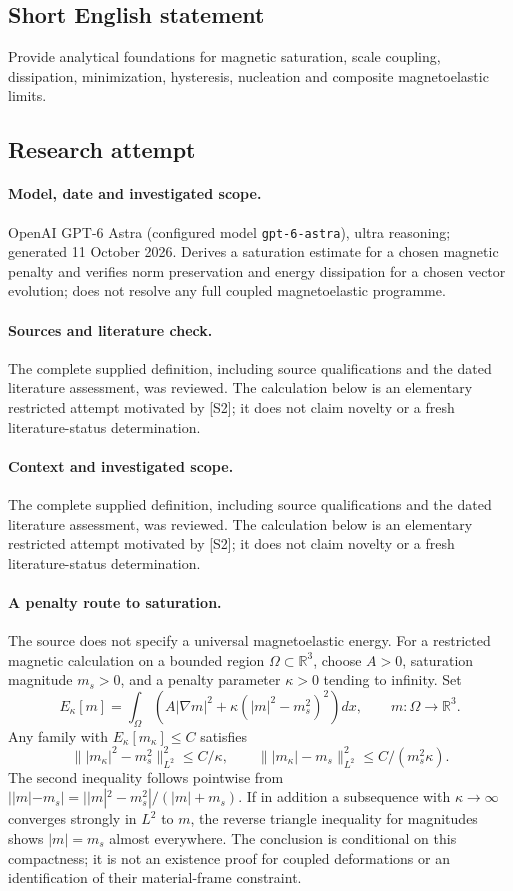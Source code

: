 \documentclass[11pt]{article}
\begin{document}
\subsection{Short English statement}
Provide analytical foundations for magnetic saturation, scale coupling, dissipation, minimization, hysteresis, nucleation and composite magnetoelastic limits.
\subsection{Research attempt}
\paragraph{Model, date and investigated scope.}
OpenAI GPT-6 Astra (configured model \texttt{gpt-6-astra}), ultra reasoning; generated 11 October 2026. Derives a saturation estimate for a chosen magnetic penalty and verifies norm preservation and energy dissipation for a chosen vector evolution; does not resolve any full coupled magnetoelastic programme.

\paragraph{Sources and literature check.}
The complete supplied definition, including source qualifications and the dated literature assessment, was reviewed. The calculation below is an elementary restricted attempt motivated by [S2]; it does not claim novelty or a fresh literature-status determination.

\paragraph{Context and investigated scope.} The complete supplied definition, including source qualifications and the dated literature assessment, was reviewed. The calculation below is an elementary restricted attempt motivated by [S2]; it does not claim novelty or a fresh literature-status determination.

\paragraph{A penalty route to saturation.}
The source does not specify a universal magnetoelastic energy. For a restricted magnetic calculation on a bounded region $\Omega\subset\mathbb R^3$, choose $A>0$, saturation magnitude $m_s>0$, and a penalty parameter $\kappa>0$ tending to infinity. Set
\[
 E_\kappa[m]=\int_\Omega\left(A|\nabla m|^2+
                 \kappa(|m|^2-m_s^2)^2\right)dx,
 \qquad m:\Omega\to\mathbb R^3.
\]
Any family with $E_\kappa[m_\kappa]\leq C$ satisfies
\[
 \bigl\||m_\kappa|^2-m_s^2\bigr\|_{L^2}^2\leq C/\kappa,
 \qquad
 \bigl\||m_\kappa|-m_s\bigr\|_{L^2}^2
 \leq C/(m_s^2\kappa).
\]
The second inequality follows pointwise from
$||m|-m_s|=||m|^2-m_s^2|/(|m|+m_s)$.
If in addition a subsequence with $\kappa\to\infty$ converges strongly in $L^2$ to $m$, the reverse triangle inequality for magnitudes shows $|m|=m_s$ almost everywhere. The conclusion is conditional on this compactness; it is not an existence proof for coupled deformations or an identification of their material-frame constraint.
\end{document}
